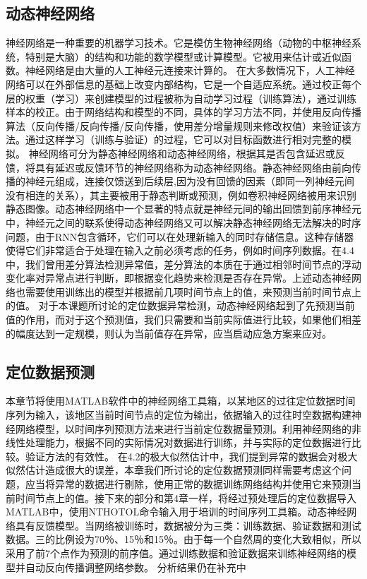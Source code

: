 \documentclass[a4paper,AutoFakeBold,oneside,12pt]{book}
\begin{document}
{{\subsection{动态神经网络}
神经网络是一种重要的机器学习技术。它是模仿生物神经网络（动物的中枢神经系统，特别是大脑）的结构和功能的数学模型或计算模型。它被用来估计或近似函数。神经网络是由大量的人工神经元连接来计算的。
	在大多数情况下，人工神经网络可以在外部信息的基础上改变内部结构，它是一个自适应系统。通过校正每个层的权重（学习）来创建模型的过程被称为自动学习过程（训练算法），通过训练样本的校正。由于网络结构和模型的不同，具体的学习方法不同，并使用反向传播算法（反向传播/反向传播/反向传播，使用差分增量规则来修改权值）来验证该方法。通过这样学习（训练与验证）的过程，它可以对目标函数进行相对完整的模拟。
	神经网络可分为静态神经网络和动态神经网络，根据其是否包含延迟或反馈，将具有延迟或反馈环节的神经网络称为动态神经网络。静态神经网络由前向传播的神经元组成，连接仅馈送到后续层,因为没有回馈的因素（即同一列神经元间没有相连的关系），其主要被用于静态判断或预测，例如卷积神经网络被用来识别静态图像。动态神经网络中一个显著的特点就是神经元间的输出回馈到前序神经元中，神经元之间的联系使得动态神经网络又可以解决静态神经网络无法解决的时序问题，由于RNN包含循环，它们可以在处理新输入的同时存储信息。这种存储器使得它们非常适合于处理在输入之前必须考虑的任务，例如时间序列数据。在4.4中，我们曾用差分算法检测异常值，差分算法的本质在于通过相邻时间节点的浮动变化率对异常点进行判断，即根据变化趋势来检测是否存在异常。上述动态神经网络也需要使用训练出的模型并根据前几项时间节点上的值，来预测当前时间节点上的值。
	对于本课题所讨论的定位数据异常检测，动态神经网络起到了先预测当前值的作用，而对于这个预测值，我们只需要和当前实际值进行比较，如果他们相差的幅度达到一定规模，则认为当前值存在异常，应当启动应急方案来应对。
\subsection{定位数据预测}
本章节将使用MATLAB软件中的神经网络工具箱，以某地区的过往定位数据时间序列为输入，该地区当前时间节点的定位为输出，依据输入的过往时空数据构建神经网络模型，以时间序列预测方法来进行当前定位数据量预测。利用神经网络的非线性处理能力，根据不同的实际情况对数据进行训练，并与实际的定位数据进行比较。验证方法的有效性。
	在4.2的极大似然估计中，我们提到异常的数据会对极大似然估计造成很大的误差，本章我们所讨论的定位数据预测同样需要考虑这个问题，应当将异常的数据进行剔除，使用正常的数据训练网络结构并使用它来预测当前时间节点上的值。接下来的部分和第4章一样，将经过预处理后的定位数据导入MATLAB中，使用NTHOTOL命令输入用于培训的时间序列工具箱。动态神经网络具有反馈模型。当网络被训练时，数据被分为三类：训练数据、验证数据和测试数据。三的比例设为70％、15％和15％。由于每一个自然周的变化大致相似，所以采用了前7个点作为预测的前序值。通过训练数据和验证数据来训练神经网络的模型并自动反向传播调整网络参数。
	分析结果仍在补充中


}}
\end{document}
